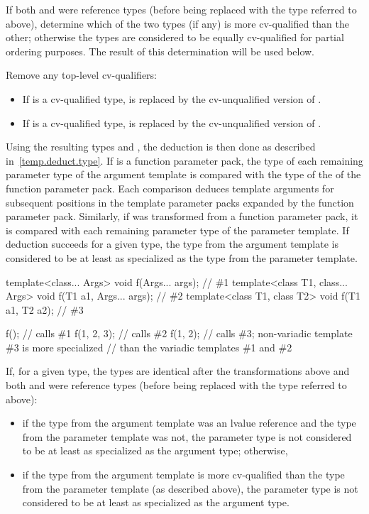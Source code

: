 \pnum
If both
and
were reference types (before being replaced with the type referred to
above), determine which of the two types (if any) is more cv-qualified
than the other; otherwise the types are considered to be equally
cv-qualified for partial ordering purposes. The result of this
determination will be used below.

\pnum
Remove any top-level cv-qualifiers:
\begin{itemize}
\item
If
is a cv-qualified type,
is replaced by the cv-unqualified version of
.
\item
If
is a cv-qualified type,
is replaced by the cv-unqualified version of
.
\end{itemize}

\pnum
Using the resulting types
and
,
the deduction is then done as described in~\ref{temp.deduct.type}.
If  is a function parameter pack, the type  of each remaining
parameter type of the argument template is compared with the type  of
the  of the function parameter pack. Each comparison
deduces template arguments for subsequent positions in the template parameter
packs expanded by the function parameter pack.
Similarly, if  was transformed from a function parameter pack,
it is compared with each remaining parameter type of the parameter template.
If deduction succeeds for a given type,
the type from the argument template is considered to be at least as specialized
as the type from the parameter template.
\begin{example}
\begin{codeblock}
template<class... Args>           void f(Args... args);         // \#1
template<class T1, class... Args> void f(T1 a1, Args... args);  // \#2
template<class T1, class T2>      void f(T1 a1, T2 a2);         // \#3

f();                // calls \#1
f(1, 2, 3);         // calls \#2
f(1, 2);            // calls \#3; non-variadic template \#3 is more specialized
                    // than the variadic templates \#1 and \#2
\end{codeblock}
\end{example}

\pnum
If, for a given type, the
types are identical after the transformations above
and both  and  were reference types (before being replaced with the
type referred to above):
\begin{itemize}
\item if the type from the argument template was an lvalue reference and the type
from the parameter template was not,
the parameter type is not considered to be
at least as specialized as the argument type; otherwise,
\item if the type from
the argument template is more cv-qualified than the type from the
parameter template (as described above),
the parameter type is not considered to be
at least as specialized as the argument type.
\end{itemize}

